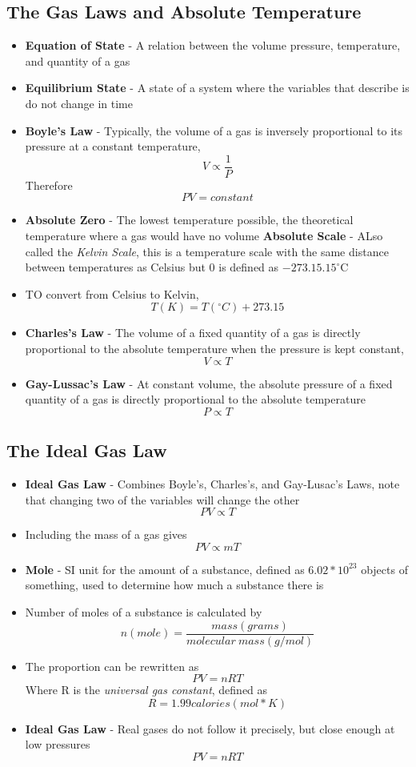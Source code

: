 \subsection{The Gas Laws and Absolute Temperature}
\begin{itemize}
    \item \textbf{Equation of State} - A relation between the volume pressure, temperature, and quantity of a gas
    \item \textbf{Equilibrium State} - A state of a system where the variables that describe is do not change in time
    \item \textbf{Boyle's Law} - Typically, the volume of a gas is inversely proportional to its pressure at a constant temperature, \[V\propto \frac{1}{P}\] Therefore \[PV=constant\]
    \item \textbf{Absolute Zero} - The lowest temperature possible, the theoretical temperature where a gas would have no volume
    \textbf{Absolute Scale} - ALso called the \emph{Kelvin Scale}, this is a temperature scale with the same distance between temperatures as Celsius but 0 is defined as \(-273.15.15^\circ\)C
    \item TO convert from Celsius to Kelvin, \[T(K)=T(^\circ C)+273.15\]
    \item \textbf{Charles's Law} - The volume of a fixed quantity of a gas is directly proportional to the absolute temperature when the pressure is kept constant, \[V\propto T\]
    \item \textbf{Gay-Lussac's Law} - At constant volume, the absolute pressure of a fixed quantity of a gas is directly proportional to the absolute temperature \[P\propto T\]
\end{itemize}

\subsection{The Ideal Gas Law}
\begin{itemize}
    \item \textbf{Ideal Gas Law} - Combines Boyle's, Charles's, and Gay-Lusac's Laws, note that changing two of the variables will change the other \[PV\propto T\]
    \item Including the mass of a gas gives \[PV\propto mT\]
    \item \textbf{Mole} - SI unit for the amount of a substance, defined as \(6.02*10^23\) objects of something, used to determine how much a substance there is
    \item Number of moles of a substance is calculated by \[n(mole)=\frac{mass(grams)}{molecular\ mass(g/mol)}\]
    \item The proportion can be rewritten as \[PV=nRT\] Where R is the \emph{universal gas constant}, defined as \[R=1.99calories(mol*K)\]
    \item \textbf{Ideal Gas Law} - Real gases do not follow it precisely, but close enough at low pressures \[PV=nRT\]
\end{itemize}

